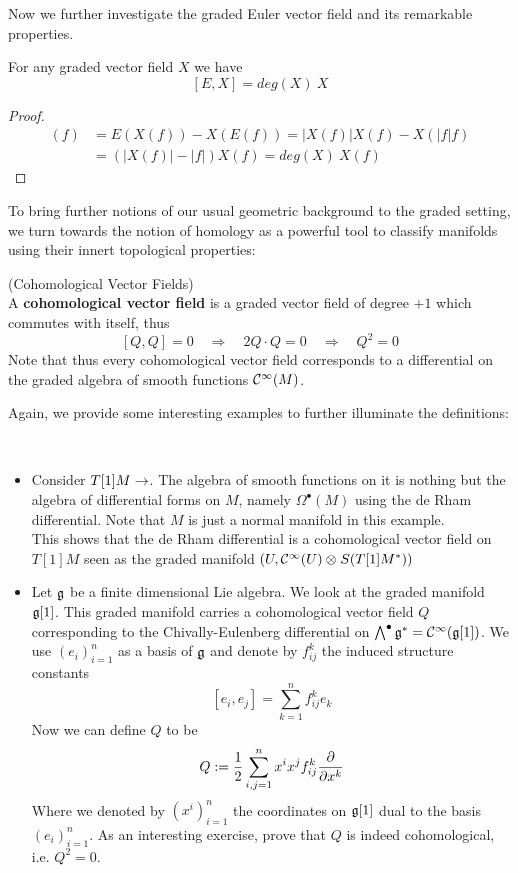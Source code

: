 Now we further investigate the graded Euler vector field and its remarkable properties.

\begin{prop}
  For any graded vector field $X$ we have
  $$ [E,X] = deg(X) \ X $$
\begin{proof}
  \begin{align}
    [E,X](f) &= E(X(f)) - X(E(f)) = |X(f)| X(f) - X(|f| f)\\
    &= (|X(f)| - |f|) X(f) = deg(X) \ X(f)
  \end{align}
\end{proof}
\end{prop}


To bring further notions of our usual geometric background to the graded setting, we turn towards the notion of homology as a powerful tool to classify manifolds using their innert topological properties:

\begin{definition} (Cohomological Vector Fields)\\
  A \textbf{cohomological vector field} is a graded vector field of degree $+1$ which commutes with itself, thus
  $$ [Q,Q] = 0 \quad \Rightarrow \quad 2 Q\cdot Q = 0 \quad \Rightarrow \quad Q^2=0 $$
  Note that thus every cohomological vector field corresponds to a differential on the graded algebra of smooth functions $\mathcal{C}^{\infty}(M)$.
\end{definition}

Again, we provide some interesting examples to further illuminate the definitions:

\begin{example}~
\begin{itemize}
  \item Consider $T[1]M \rightarrow $. The algebra of smooth functions on it is nothing but the algebra of differential forms on $M$, namely $\Omega^\bullet(M)$ using the de Rham differential. Note that $M$ is just a normal manifold in this example.\\
  This shows that the de Rham differential is a cohomological vector field on $T[1]M$ seen as the graded manifold $(U, \mathcal{C}^{\infty}(U) \mathbin{\mathop{\otimes}\displaylimits_{}}S(T[1]M^*))$

  \item Let $\mathfrak{g}$ be a finite dimensional Lie algebra. We look at the graded manifold $\mathfrak{g} [1]$. This graded manifold carries a cohomological vector field $Q$ corresponding to the Chivally-Eulenberg differential on $\bigwedge^\bullet \mathfrak{g}^* = \mathcal{C}^{\infty}(\mathfrak{g}[1])$. We use $(e_i)^n_{i=1}$ as a basis of $\mathfrak{g}$ and denote by $f^k_{ij}$ the induced structure constants
  $$ [e_i, e_j] = \sum_{k=1}^n f_{ij}^k e_k $$
  Now we can define $Q$ to be
  $$ Q := \frac{1}{2} \sum_{i,j = 1}^n x^i x^j f_{ij}^k \frac{\partial }{\partial x^k} $$
  Where we denoted by $(x^i)_{i=1}^n$ the coordinates on $\mathfrak{g}[1]$ dual to the basis $(e_i)^n_{i=1}$. As an interesting exercise, prove that $Q$ is indeed cohomological, i.e. $Q^2=0$.
\end{itemize}
\end{example}

